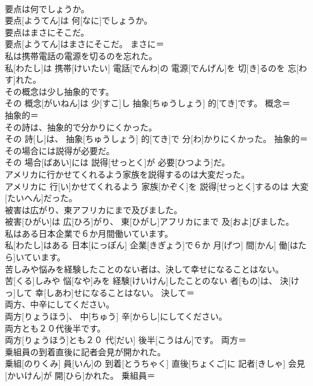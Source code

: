 \documentclass[8pt]{extreport}
\begin{document}
\begin{CJK}{UTF8}{min}
\\	要点は何でしょうか。	
\\	要点[ようてん]は 何[なに]でしょうか。	
\\	要点はまさにそこだ。	
\\	要点[ようてん]はまさにそこだ。	まさに＝ 
\\	私は携帯電話の電源を切るのを忘れた。	
\\	私[わたし]は 携帯[けいたい] 電話[でんわ]の 電源[でんげん]を 切[き]るのを 忘[わす]れた。	
\\	その概念は少し抽象的です。	
\\	その 概念[がいねん]は 少[すこ]し 抽象[ちゅうしょう] 的[てき]です。	概念＝ 
\\	抽象的＝ 
\\	その詩は、抽象的で分かりにくかった。	
\\	その 詩[し]は、 抽象[ちゅうしょう] 的[てき]で 分[わ]かりにくかった。	抽象的＝ 
\\	その場合には説得が必要だ。	
\\	その 場合[ばあい]には 説得[せっとく]が 必要[ひつよう]だ。	
\\	アメリカに行かせてくれるよう家族を説得するのは大変だった。	
\\	アメリカに 行[い]かせてくれるよう 家族[かぞく]を 説得[せっとく]するのは 大変[たいへん]だった。	
\\	被害は広がり、東アフリカにまで及びました。	
\\	被害[ひがい]は 広[ひろ]がり、 東[ひがし]アフリカにまで 及[およ]びました。	
\\	私はある日本企業で６か月間働いています。	
\\	私[わたし]はある 日本[にっぽん] 企業[きぎょう]で６か 月[げつ] 間[かん] 働[はたら]いています。	
\\	苦しみや悩みを経験したことのない者は、決して幸せになることはない。	
\\	苦[くる]しみや 悩[なや]みを 経験[けいけん]したことのない 者[もの]は、 決[けっ]して 幸[しあわ]せになることはない。	決して＝ 
\\	両方、中辛にしてください。	
\\	両方[りょうほう]、 中[ちゅう] 辛[からし]にしてください。	
\\	両方とも２０代後半です。	
\\	両方[りょうほう]とも２０ 代[だい] 後半[こうはん]です。	両方＝ 
\\	乗組員の到着直後に記者会見が開かれた。	
\\	乗組[のりくみ] 員[いん]の 到着[とうちゃく] 直後[ちょくご]に 記者[きしゃ] 会見[かいけん]が 開[ひら]かれた。	乗組員＝ 

\end{CJK}
\end{document}
